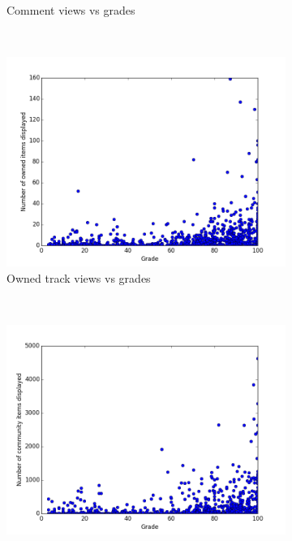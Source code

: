 \documentclass[11pt, oneside]{article}   	%
\begin{document}
\begin{figure}
\begin{subfigure}[b]{0.4\textwidth}
                 \caption{Comment views vs grades}
                 \label{comments}
         \end{subfigure}
        ~ %
        \begin{subfigure}[b]{0.4\textwidth}
                 \includegraphics[width=\textwidth]{./pythonScripts/generalStatistics/mytracks.png}
                 \caption{Owned track views vs grades}
                 \label{mytracks}
         \end{subfigure}
         ~ %
	\begin{subfigure}[b]{0.4\textwidth}
                 \includegraphics[width=\textwidth]{./pythonScripts/generalStatistics/community.png}

\end{subfigure}
\end{figure}
\end{document}
